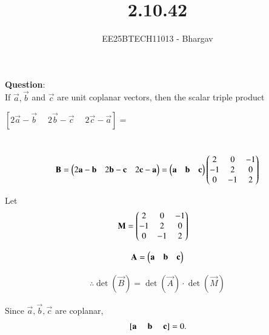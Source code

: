\documentclass[journal]{IEEEtran}
\begin{document}

\vspace{3cm}

\title{2.10.42}
\author{EE25BTECH11013 - Bhargav}
\maketitle
{\let\newpage\relax\maketitle}

\renewcommand{\thefigure}{\theenumi}
\renewcommand{\thetable}{\theenumi}
\setlength{\intextsep}{10pt} %


\renewcommand{\thetable}{\theenumi}

\textbf{Question}:\\
If $\vec{a}, \vec{b}$ and $\vec{c}$ are unit coplanar vectors, then the scalar triple product 

$[2\vec{a} - \vec{b} \;\quad 2\vec{b} - \vec{c} \;\quad 2\vec{c} - \vec{a}] =$


\solution \\


\begin{align}
\mathbf{B} = \begin{pmatrix}2\mathbf{a} - \mathbf{b} & 2\mathbf{b} - \mathbf{c} & 2\mathbf{c} - \mathbf{a}\end{pmatrix} = 
\begin{pmatrix}
\mathbf{a} & \mathbf{b} & \mathbf{c}
\end{pmatrix}
\begin{pmatrix}
2 & 0 & -1 \\
-1 & 2 & 0 \\
0 & -1 & 2
\end{pmatrix}
\end{align}

Let
\begin{align}
\mathbf{M} &= \begin{pmatrix}
2 & 0 & -1 \\
-1 & 2 & 0 \\
0 & -1 & 2
\end{pmatrix}
\end{align}

\begin{align}
\mathbf{A} = \begin{pmatrix}\mathbf{a} & \mathbf{b} & \mathbf{c}\end{pmatrix} 
\end{align}

\begin{align}
\therefore \det(\vec{B}) = \det(\vec{A})\cdot \det(\vec{M})
\end{align}


Since $\vec{a}, \vec{b}, \vec{c}$ are coplanar,
\begin{align}
{}\left[\mathbf{a} \;\quad \mathbf{b} \;\quad \mathbf{c}\right] = 0.
\end{align}
\end{document}
